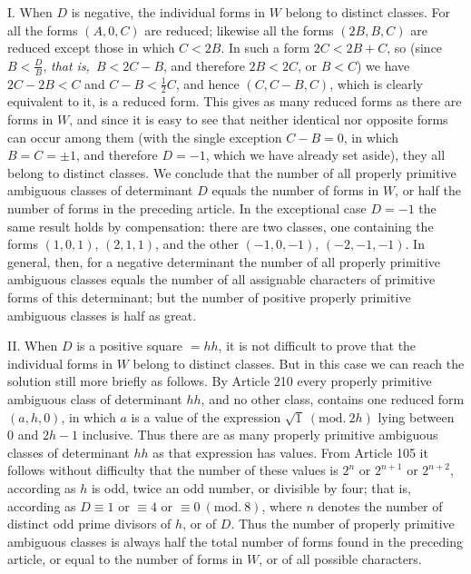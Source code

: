 I. When $D$ is negative, the individual forms in $W$ belong to distinct classes. For all the forms $(A,0,C)$ are reduced; likewise all the forms $(2B,B,C)$ are reduced except those in which $C<2B$. In such a form $2C<2B+C$, so (since $B<\frac{D}{B}$, \textit{that is,}\ $B<2C-B$, and therefore $2B<2C$, or $B<C$) we have $2C-2B<C$ and $C-B<\frac12 C$, and hence $(C,C-B,C)$, which is clearly equivalent to it, is a reduced form. This gives as many reduced forms as there are forms in $W$, and since it is easy to see that neither identical nor opposite forms can occur among them (with the single exception $C-B=0$, in which $B=C=\pm1$, and therefore $D=-1$, which we have already set aside), they all belong to distinct classes. We conclude that the number of all properly primitive ambiguous classes of determinant $D$ equals the number of forms in $W$, or half the number of forms in the preceding article. In the exceptional case $D=-1$ the same result holds by compensation: there are two classes, one containing the forms $(1,0,1)$, $(2,1,1)$, and the other $(-1,0,-1)$, $(-2,-1,-1)$. In general, then, for a negative determinant the number of all properly primitive ambiguous classes equals the number of all
assignable characters of primitive forms of this determinant; but the number of positive properly primitive ambiguous classes is half as great.

II. When $D$ is a positive square $=hh$, it is not difficult to prove that the individual forms in $W$ belong to distinct classes. But in this case we can reach the solution still more briefly as follows. By Article 210 every properly primitive ambiguous class of determinant $hh$, and no other class, contains one reduced form $(a,h,0)$, in which $a$ is a value of the expression $\sqrt{1}\ (\mathrm{mod.}\ 2h)$ lying between $0$ and $2h-1$ inclusive. Thus there are as many properly primitive ambiguous classes of determinant $hh$ as that expression has values. From Article 105 it follows without difficulty that the number of these values is $2^n$ or $2^{n+1}$ or $2^{n+2}$, according as $h$ is odd, twice an odd number, or divisible by four; that is, according as $D\equiv1$ or $\equiv4$ or $\equiv0\ (\mathrm{mod.}\ 8)$, where $n$ denotes the number of distinct odd prime divisors of $h$, or of $D$. Thus the number of properly primitive ambiguous classes is always half the total number of forms found in the preceding article, or equal to the number of forms in $W$, or of all possible characters.

